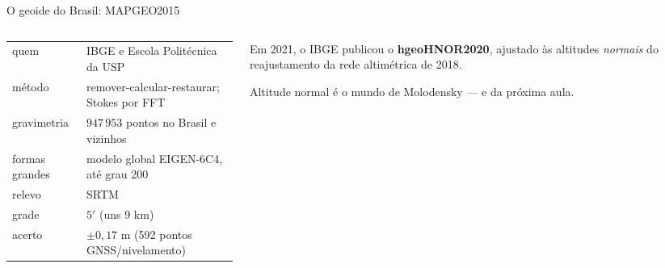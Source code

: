 \documentclass[aspectratio=169,11pt]{beamer}
\begin{document}
\begin{frame}{O geoide do Brasil: MAPGEO2015}
  \begin{columns}[T]
    \begin{column}{0.56\textwidth}
      \centering
      \small
      \renewcommand{\arraystretch}{1.3}
      \begin{tabular}{lp{4.3cm}}
        \toprule
        quem & IBGE e Escola Politécnica da USP \\
        método & remover-calcular-restaurar; Stokes por FFT \\
        gravimetria & $947\,953$ pontos no Brasil e vizinhos \\
        formas grandes & modelo global EIGEN-6C4, até grau 200 \\
        relevo & SRTM \\
        grade & $5'$ (uns 9 km) \\
        acerto & $\pm 0{,}17$ m (592 pontos GNSS/nivelamento) \\
        \bottomrule
      \end{tabular}
    \end{column}
    \begin{column}{0.40\textwidth}
      \begin{ideia}[title={E depois dele}]
        \small Em 2021, o IBGE publicou o \textbf{hgeoHNOR2020}, ajustado às altitudes
        \emph{normais} do reajustamento da rede altimétrica de 2018.
        \medskip

        Altitude normal é o mundo de Molodensky --- e da próxima aula.
      \end{ideia}
    \end{column}
  \end{columns}
\end{frame}
\end{document}
